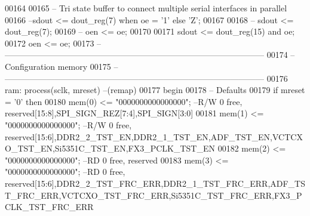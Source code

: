 \begin{DoxyCode}
00164    
00165 \textcolor{keyword}{   -- Tri state buffer to connect multiple serial interfaces in parallel}
00166 \textcolor{keyword}{   --sdout <= dout\_reg(7) when oe = '1' else 'Z';}
00167 
00168 \textcolor{keyword}{-- sdout <= dout\_reg(7);}
00169 \textcolor{keyword}{-- oen <= oe;}
00170 
00171    \textcolor{vhdlchar}{sdout} \textcolor{vhdlchar}{<=} \textcolor{vhdlchar}{dout_reg}\textcolor{vhdlchar}{(}\textcolor{vhdllogic}{}\textcolor{vhdllogic}{15}\textcolor{vhdlchar}{)} \textcolor{keywordflow}{and} \textcolor{vhdlchar}{oe};
00172    \textcolor{vhdlchar}{oen} \textcolor{vhdlchar}{<=} \textcolor{vhdlchar}{oe};
00173 \textcolor{keyword}{   -- ---------------------------------------------------------------------------------------------}
00174 \textcolor{keyword}{   -- Configuration memory}
00175 \textcolor{keyword}{   -- --------------------------------------------------------------------------------------------- }
00176    ram: \textcolor{keywordflow}{process}(sclk, mreset)\textcolor{keyword}{ --(remap)}
00177 \textcolor{vhdlkeyword}{   begin}
00178 \textcolor{keyword}{      -- Defaults}
00179       \textcolor{keywordflow}{if} \textcolor{vhdlchar}{mreset} \textcolor{vhdlchar}{=} \textcolor{vhdlchar}{'}\textcolor{vhdllogic}{}\textcolor{vhdllogic}{0}\textcolor{vhdlchar}{'} \textcolor{keywordflow}{then}   
00180          \textcolor{vhdlchar}{mem}\textcolor{vhdlchar}{(}\textcolor{vhdllogic}{}\textcolor{vhdllogic}{0}\textcolor{vhdlchar}{)}   \textcolor{vhdlchar}{<=} \textcolor{vhdllogic}{"0000000000000000"};\textcolor{keyword}{ --R/W  0 free, reserved[15:8],SPI\_SIGN\_REZ[7:4],SPI\_SIGN[3:0]}
00181          \textcolor{vhdlchar}{mem}\textcolor{vhdlchar}{(}\textcolor{vhdllogic}{}\textcolor{vhdllogic}{1}\textcolor{vhdlchar}{)}   \textcolor{vhdlchar}{<=} \textcolor{vhdllogic}{"0000000000000000"};\textcolor{keyword}{ --R/W  0 free,
       reserved[15:6],DDR2\_2\_TST\_EN,DDR2\_1\_TST\_EN,ADF\_TST\_EN,VCTCXO\_TST\_EN,Si5351C\_TST\_EN,FX3\_PCLK\_TST\_EN}
00182          \textcolor{vhdlchar}{mem}\textcolor{vhdlchar}{(}\textcolor{vhdllogic}{}\textcolor{vhdllogic}{2}\textcolor{vhdlchar}{)}   \textcolor{vhdlchar}{<=} \textcolor{vhdllogic}{"0000000000000000"};\textcolor{keyword}{ --RD   0 free, reserved}
00183          \textcolor{vhdlchar}{mem}\textcolor{vhdlchar}{(}\textcolor{vhdllogic}{}\textcolor{vhdllogic}{3}\textcolor{vhdlchar}{)}   \textcolor{vhdlchar}{<=} \textcolor{vhdllogic}{"0000000000000000"};\textcolor{keyword}{ --RD   0 free,
       reserved[15:6],DDR2\_2\_TST\_FRC\_ERR,DDR2\_1\_TST\_FRC\_ERR,ADF\_TST\_FRC\_ERR,VCTCXO\_TST\_FRC\_ERR,Si5351C\_TST\_FRC\_ERR,FX3\_PCLK\_TST\_FRC\_ERR}

\end{DoxyCode}
